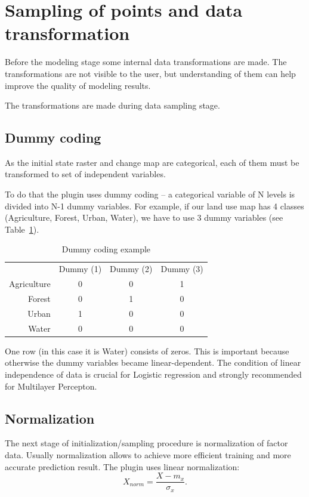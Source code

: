 \documentclass{report}
\begin{document}
\section{Sampling of points and data transformation}

Before the modeling stage some internal data transformations are made.
The transformations are not visible to the user, but understanding of them can help improve the quality of modeling results.

The transformations are made during data sampling stage.


\subsection{Dummy coding}\label{subsec:dummy_coding}
As the initial state raster and change map are categorical, each of them must be transformed to set of independent variables.

To do that the plugin uses dummy coding -- a categorical variable of N levels is divided into N-1 dummy variables. For example, if our land use map has 4 classes (Agriculture, Forest, Urban, Water), we have to use 3 dummy variables (see Table~\ref{tab:dummy_coding_example}). 

\begin{table}[]
\centering
\caption{Dummy coding example}
\begin{tabular}{rccc}
           & Dummy (1) & Dummy (2) & Dummy (3) \\
Agriculture & 0    & 0         & 1  \\
Forest&  0        & 1        & 0  \\
Urban &  1         &   0      & 0 \\ 
Water &  0         & 0        & 0            
\end{tabular}
\label{tab:dummy_coding_example}
\end{table}

One row (in this case it is Water) consists of zeros.
This is important because otherwise the dummy variables became linear-dependent.
The condition of linear independence of data is crucial for Logistic regression and strongly recommended for Multilayer Percepton. 



\subsection{Normalization}\label{subsec:normalization}
The next stage of initialization/sampling procedure is normalization of factor data. Usually normalization allows to achieve more efficient training and more accurate prediction result. The plugin uses linear normalization:
$$
X_{norm} = \frac{X-m_x}{\sigma_x}.
$$
\end{document}
